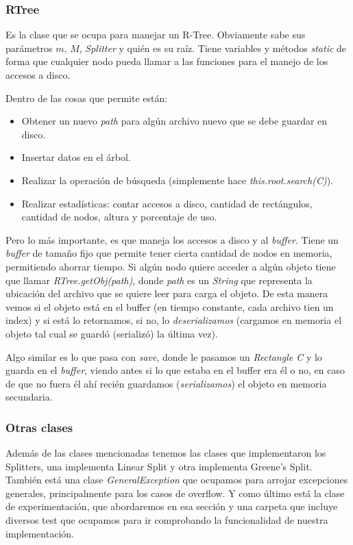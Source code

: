 \documentclass[letterpaper,11pt]{article} %
\begin{document}
		\subsubsection{RTree}
			Es la clase que se ocupa para manejar un R-Tree. Obviamente sabe sus parámetros $m$, $M$, \textit{Splitter} y quién es su raíz. Tiene variables y métodos \textit{static} de forma que cualquier nodo pueda llamar a las funciones para el manejo de los accesos a disco.
			
			Dentro de las cosas que permite están:
			\begin{itemize}
				\item Obtener un nuevo \textit{path} para algún archivo nuevo que se debe guardar en disco.
				\item Insertar datos en el árbol.
				\item Realizar la operación de búsqueda (simplemente hace \textit{this.root.search(C)}).
				\item Realizar estadísticas: contar accesos a disco, cantidad de rectángulos, cantidad de nodos, altura y porcentaje de uso.
			\end{itemize}
			
			Pero lo más importante, es que maneja los accesos a disco y al \textit{buffer}. Tiene un \textit{buffer} de tamaño fijo que permite tener cierta cantidad de nodos en memoria, permitiendo ahorrar tiempo. Si algún nodo quiere acceder a algún objeto tiene que llamar \textit{RTree.getObj(path)}, donde \textit{path} es un \textit{String} que representa la ubicación del archivo que se quiere leer para carga el objeto. De esta manera vemos si el objeto está en el buffer (en tiempo constante, cada archivo tien un index) y si está lo retornamos, si no, lo \textit{deserializamos} (cargamos en memoria el objeto tal cual se guardó (serializó) la última vez).
			
			Algo similar es lo que pasa con \textit{save}, donde le pasamos un \textit{Rectangle C} y lo guarda en el \textit{buffer}, viendo antes si lo que estaba en el buffer era él o no, en caso de que no fuera él ahí recién guardamos (\textit{serializamos}) el objeto en memoria secundaria.
			
		\subsubsection{Otras clases}
			Además de las clases mencionadas tenemos las clases que implementaron los Splitters, una implementa Linear Split y otra implementa Greene's Split. También está una clase \textit{GeneralException} que ocupamos para arrojar excepciones generales, principalmente para los casos de overflow. Y como último está la clase de experimentación, que abordaremos en esa sección y una carpeta que incluye diversos test que ocupamos para ir comprobando la funcionalidad de nuestra implementación.
			
\end{document}
